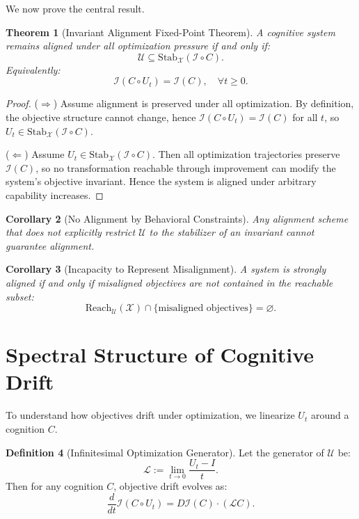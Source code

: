 \documentclass[11pt,a4paper]{article}
\theoremstyle{plain}
\newtheorem{theorem}{Theorem}[section]
\newtheorem{corollary}[theorem]{Corollary}
\theoremstyle{definition}
\newtheorem{definition}[theorem]{Definition}
\theoremstyle{remark}
\numberwithin{equation}{section}
\newcommand{\I}{\mathcal{I}}
\newcommand{\X}{\mathcal{X}}
\newcommand{\U}{\mathcal{U}}
\newcommand{\Stab}{\text{Stab}}
\newcommand{\Lie}{\mathcal{L}}
\begin{document}
We now prove the central result.

\begin{theorem}[Invariant Alignment Fixed-Point Theorem]
\label{thm:main}
A cognitive system remains aligned under all optimization pressure if and only if:
\[
\U \subseteq \Stab_\X(\I \circ C).
\]
Equivalently:
\[
\I(C \circ U_t) = \I(C), \quad \forall t \ge 0.
\]
\end{theorem}

\begin{proof}
($\Rightarrow$) Assume alignment is preserved under all optimization. By definition, the objective structure cannot change, hence $\I(C \circ U_t) = \I(C)$ for all $t$, so $U_t \in \Stab_\X(\I \circ C)$.

($\Leftarrow$) Assume $U_t \in \Stab_\X(\I \circ C)$. Then all optimization trajectories preserve $\I(C)$, so no transformation reachable through improvement can modify the system’s objective invariant. Hence the system is aligned under arbitrary capability increases.
\end{proof}

\begin{corollary}[No Alignment by Behavioral Constraints]
Any alignment scheme that does not explicitly restrict $\U$ to the stabilizer of an invariant cannot guarantee alignment.
\end{corollary}

\begin{corollary}[Incapacity to Represent Misalignment]
A system is strongly aligned if and only if misaligned objectives are not contained in the reachable subset:
\[
\text{Reach}_\U(\X) \cap \{\text{misaligned objectives}\} = \varnothing.
\]
\end{corollary}

\section{Spectral Structure of Cognitive Drift}

To understand how objectives drift under optimization, we linearize $U_t$ around a cognition $C$.

\begin{definition}[Infinitesimal Optimization Generator]
Let the generator of $\U$ be:
\[
\Lie := \lim_{t \to 0} \frac{U_t - I}{t}.
\]
Then for any cognition $C$, objective drift evolves as:
\[
\frac{d}{dt} \I(C \circ U_t) = D\I(C) \cdot (\Lie C).
\]
\end{definition}
\end{document}
